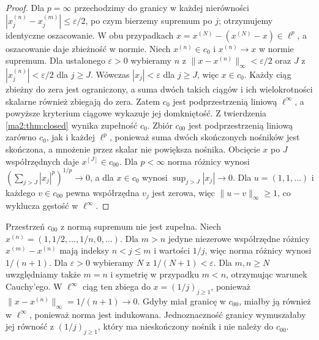\begin{proof}
Dla $p=\infty$ przechodzimy do granicy w każdej nierówności
$|x_j^{(n)}-x_j^{(m)}|\le\varepsilon/2$, po czym bierzemy
supremum po $j$; otrzymujemy identyczne oszacowanie.
W obu przypadkach $x=x^{(N)}-(x^{(N)}-x)\in\ell^p$,
a oszacowanie daje zbieżność w normie.
Niech $x^{(n)}\in c_0$ i $x^{(n)}\to x$ w normie supremum.
Dla ustalonego $\varepsilon>0$
wybieramy $n$ z $\|x-x^{(n)}\|_\infty<\varepsilon/2$
oraz $J$ z $|x_j^{(n)}|<\varepsilon/2$ dla $j\ge J$.
Wówczas $|x_j|<\varepsilon$ dla $j\ge J$, więc $x\in c_0$.
Każdy ciąg zbieżny do zera jest ograniczony, a suma dwóch takich
ciągów i ich wielokrotności skalarne również zbiegają do zera.
Zatem $c_0$ jest podprzestrzenią liniową $\ell^\infty$,
a powyższe kryterium ciągowe wykazuje jej domkniętość.
Z twierdzenia \ref{ma2:thm:closed} wynika zupełność $c_0$.
Zbiór $c_{00}$ jest podprzestrzenią liniową zarówno $c_0$,
jak i każdej $\ell^p$, ponieważ suma dwóch skończonych
nośników jest skończona, a mnożenie przez skalar nie
powiększa nośnika.
Obcięcie $x$ po $J$ współrzędnych daje $x^{[J]}\in c_{00}$.
Dla $p<\infty$ norma różnicy wynosi
$(\sum_{j>J}|x_j|^p)^{1/p}\to0$, a dla $x\in c_0$
wynosi $\sup_{j>J}|x_j|\to0$. Dla $u=(1,1,\ldots)$
i każdego $v\in c_{00}$ pewna współrzędna $v_j$ jest zerowa,
więc $\|u-v\|_\infty\ge1$, co wyklucza gęstość w $\ell^\infty$.
\end{proof}

\begin{przyklad}
Przestrzeń $c_{00}$ z normą supremum nie jest zupełna.
Niech $x^{(n)}=(1,1/2,\ldots,1/n,0,\ldots)$.
Dla $m>n$ jedyne niezerowe współrzędne różnicy
$x^{(m)}-x^{(n)}$ mają indeksy $n<j\le m$ i wartości $1/j$,
więc norma różnicy wynosi $1/(n+1)$.
Dla $\varepsilon>0$ wybieramy $N$ z $1/(N+1)<\varepsilon$.
Dla $m,n\ge N$ uwzględniamy także $m=n$ i symetrię
w przypadku $m<n$, otrzymując warunek Cauchy'ego.
W $\ell^\infty$ ciąg ten zbiega do $x=(1/j)_{j\ge1}$,
ponieważ $\|x-x^{(n)}\|_\infty=1/(n+1)\to0$.
Gdyby miał granicę w $c_{00}$, miałby ją również
w $\ell^\infty$, ponieważ norma jest indukowana.
Jednoznaczność granicy wymuszałaby jej równość z $(1/j)_{j\ge1}$,
który ma nieskończony nośnik i nie należy do $c_{00}$.
\end{przyklad}

